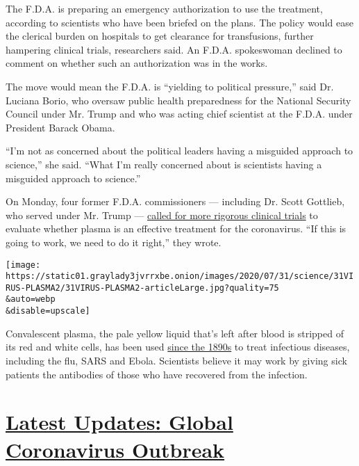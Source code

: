 The F.D.A. is preparing an emergency authorization to use the treatment,
according to scientists who have been briefed on the plans. The policy
would ease the clerical burden on hospitals to get clearance for
transfusions, further hampering clinical trials, researchers said. An
F.D.A. spokeswoman declined to comment on whether such an authorization
was in the works.

The move would mean the F.D.A. is ``yielding to political pressure,''
said Dr. Luciana Borio, who oversaw public health preparedness for the
National Security Council under Mr. Trump and who was acting chief
scientist at the F.D.A. under President Barack Obama.

``I'm not as concerned about the political leaders having a misguided
approach to science,'' she said. ``What I'm really concerned about is
scientists having a misguided approach to science.''

On Monday, four former F.D.A. commissioners --- including Dr. Scott
Gottlieb, who served under Mr. Trump ---
\href{https://www.washingtonpost.com/opinions/2020/08/03/4-former-fda-commissioners-blood-plasma-might-be-covid-19-treatment-we-need/}{called
for more rigorous clinical trials} to evaluate whether plasma is an
effective treatment for the coronavirus. ``If this is going to work, we
need to do it right,'' they wrote.

\texttt{[image: https://static01.graylady3jvrrxbe.onion/images/2020/07/31/science/31VIRUS-PLASMA2/31VIRUS-PLASMA2-articleLarge.jpg?quality=75\\\&auto=webp\\\&disable=upscale]}

Convalescent plasma, the pale yellow liquid that's left after blood is
stripped of its red and white cells, has been used
\href{https://www.ncbi.nlm.nih.gov/pmc/articles/PMC4781783/}{since the
1890s} to treat infectious diseases, including the flu, SARS and Ebola.
Scientists believe it may work by giving sick patients the antibodies of
those who have recovered from the infection.

\hypertarget{latest-updates-global-coronavirus-outbreak}{%
\section{\texorpdfstring{\href{https://www.nytimes3xbfgragh.onion/2020/08/04/world/coronavirus-cases.html?action=click\&pgtype=Article\&state=default\&region=MAIN_CONTENT_1\&context=storylines_live_updates}{Latest
Updates: Global Coronavirus
Outbreak}}{Latest Updates: Global Coronavirus Outbreak}}\label{latest-updates-global-coronavirus-outbreak}}

